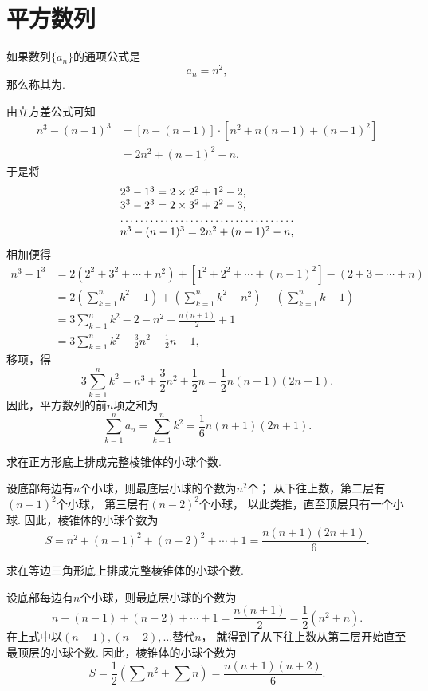 \section{平方数列}
如果数列\(\{a_n\}\)的通项公式是\[
a_n = n^2,
\]那么称其为.

由立方差公式可知
\[\begin{aligned}
n^3 - (n-1)^3
&= [n - (n-1)] \cdot [n^2 + n(n-1) + (n-1)^2] \\
&= 2n^2 + (n-1)^2 - n.
\end{aligned}\]于是将\[
\begin{array}{l}
2^3 - 1^3 = 2\times2^2+1^2-2, \\
3^3 - 2^3 = 2\times3^2+2^2-3, \\
\hdotsfor{1} \\
n^3 - (n-1)^3 = 2n^2 + (n-1)^2 - n,
\end{array}
\]相加便得\[\begin{aligned}
n^3 - 1^3
&= 2(2^2+3^2+\dotsb+n^2) + [1^2+2^2+\dotsb+(n-1)^2] - (2+3+\dotsb+n) \\
&= 2\left(\sum\limits_{k=1}^n k^2 - 1\right)
    + \left(\sum\limits_{k=1}^n k^2 - n^2\right)
    - \left(\sum\limits_{k=1}^n k - 1\right) \\
&= 3\sum\limits_{k=1}^n k^2 - 2 - n^2 - \frac{n(n+1)}{2} + 1 \\
&= 3\sum\limits_{k=1}^n k^2 - \frac{3}{2} n^2 - \frac{1}{2} n - 1,
\end{aligned}\]
移项，得\[
3 \sum\limits_{k=1}^n k^2
= n^3 + \frac{3}{2} n^2 + \frac{1}{2} n
= \frac{1}{2} n (n+1) (2n+1).
\]
因此，平方数列的前\(n\)项之和为
\begin{equation}
	\sum\limits_{k=1}^n a_n
	= \sum\limits_{k=1}^n k^2
	= \frac{1}{6} n(n+1)(2n+1).
\end{equation}

\begin{example}
求在正方形底上排成完整棱锥体的小球个数.
\begin{solution}
设底部每边有\(n\)个小球，则最底层小球的个数为\(n^2\)个；
从下往上数，第二层有\((n-1)^2\)个小球，
第三层有\((n-2)^2\)个小球，
以此类推，直至顶层只有一个小球.
因此，棱锥体的小球个数为\[
    S = n^2+(n-1)^2+(n-2)^2+\dotsb+1
    = \frac{n(n+1)(2n+1)}{6}.
\]
\end{solution}
\end{example}

\begin{example}
求在等边三角形底上排成完整棱锥体的小球个数.
\begin{solution}
设底部每边有\(n\)个小球，则最底层小球的个数为\[
    n+(n-1)+(n-2)+\dotsb+1
    = \frac{n(n+1)}{2}
    = \frac{1}{2}(n^2+n).
\]
在上式中以\((n-1),(n-2),\dotsc\)替代\(n\)，
就得到了从下往上数从第二层开始直至最顶层的小球个数.
因此，棱锥体的小球个数为\[
    S = \frac{1}{2} (\sum n^2 + \sum n)
    = \frac{n(n+1)(n+2)}{6}.
\]
\end{solution}
\end{example}

